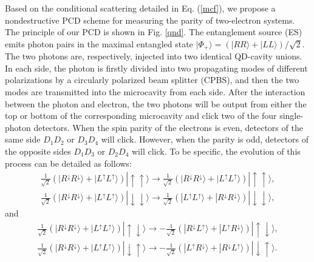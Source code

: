 \documentclass[aps,graphicx,twocolumn]{revtex4}%
\begin{document}


Based on the conditional scattering detailed in Eq. (\ref{mcf}), we propose a nondestructive PCD scheme for measuring the parity of  two-electron systems. The principle of our PCD is shown in Fig. \ref{qnd}. The entanglement source (ES) emits photon pairs in the maximal entangled state $|\Phi_+\rangle=(|RR\rangle+|LL\rangle)/\sqrt{2}$. The two photons are, respectively, injected into two identical QD-cavity unions. In each side, the photon is firstly divided into two propagating modes of different polarizations by a circularly polarized beam splitter (CPBS), and then the two modes are transmitted into the microcavity from each side. After the interaction between the photon and electron, the two photons will be output from either the top or bottom of the corresponding microcavity and click two of the four single-photon detectors. When the spin parity of the electrons is even, detectors of the same side $D_1D_2$ or $D_3D_4$ will click. However, when the parity is odd, detectors of the opposite sides $D_1D_3$ or $D_2D_4$ will click. To be specific, the evolution of this process can be detailed as follows:
\begin{equation}\label{gate1}
  \begin{split}
  \frac{1}{\sqrt{2}}(|R^{\downarrow}R^{\downarrow}\rangle+|L^{\uparrow}L^{\uparrow}\rangle)|\!\!\uparrow\uparrow\rangle
  \rightarrow\frac{1}{\sqrt{2}}(|R^{\downarrow}R^{\downarrow}\rangle+|L^{\uparrow}L^{\uparrow}\rangle)|\!\!\uparrow\uparrow\rangle,\\
  \frac{1}{\sqrt{2}}(|R^{\downarrow}R^{\downarrow}\rangle+|L^{\uparrow}L^{\uparrow}\rangle)|\!\!\downarrow\downarrow\rangle
  \rightarrow\frac{1}{\sqrt{2}}(|L^{\uparrow}L^{\uparrow}\rangle+|R^{\downarrow}R^{\downarrow}\rangle)|\!\!\downarrow\downarrow\rangle,
  \end{split}
\end{equation}
and
\begin{equation}\label{gate2}
  \begin{split}
  \frac{1}{\sqrt{2}}(|R^{\downarrow}R^{\downarrow}\rangle+|L^{\uparrow}L^{\uparrow}\rangle)|\!\!\uparrow\downarrow\rangle
  \rightarrow-\frac{1}{\sqrt{2}}(|R^{\downarrow}L^{\uparrow}\rangle+|L^{\uparrow}R^{\downarrow}\rangle)|\!\!\uparrow\downarrow\rangle,\\
  \frac{1}{\sqrt{2}}(|R^{\downarrow}R^{\downarrow}\rangle+|L^{\uparrow}L^{\uparrow}\rangle)|\!\!\downarrow\uparrow\rangle
  \rightarrow-\frac{1}{\sqrt{2}}(|L^{\uparrow}R^{\downarrow}\rangle+|R^{\downarrow}L^{\uparrow}\rangle)|\!\!\downarrow\uparrow\rangle.
  \end{split}
\end{equation}
\end{document}
